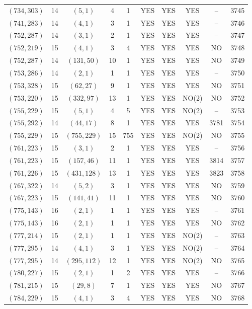 \begin{longtable}{|c|c|c|c|c|c|c|c|c|c|}
$(734, 303)$ & 14 & $(5, 1)$ & 4 & 1 & YES & YES & YES & -- & 3745\\
$(741, 283)$ & 14 & $(4, 1)$ & 3 & 1 & YES & YES & YES & -- & 3746\\
$(752, 287)$ & 14 & $(3, 1)$ & 2 & 1 & YES & YES & YES & -- & 3747\\
$(752, 219)$ & 15 & $(4, 1)$ & 3 & 4 & YES & YES & YES & NO & 3748\\
$(752, 287)$ & 14 & $(131, 50)$ & 10 & 1 & YES & YES & YES & NO & 3749\\
$(753, 286)$ & 14 & $(2, 1)$ & 1 & 1 & YES & YES & YES & -- & 3750\\
$(753, 328)$ & 15 & $(62, 27)$ & 9 & 1 & YES & YES & YES & NO & 3751\\
$(753, 220)$ & 15 & $(332, 97)$ & 13 & 1 & YES & YES & NO(2) & NO & 3752\\
$(755, 229)$ & 15 & $(5, 1)$ & 4 & 5 & YES & YES & NO(2) & -- & 3753\\
$(755, 292)$ & 14 & $(44, 17)$ & 8 & 1 & YES & YES & YES & 3781 & 3754\\
$(755, 229)$ & 15 & $(755, 229)$ & 15 & 755 & YES & YES & NO(2) & NO & 3755\\
$(761, 223)$ & 15 & $(3, 1)$ & 2 & 1 & YES & YES & YES & -- & 3756\\
$(761, 223)$ & 15 & $(157, 46)$ & 11 & 1 & YES & YES & YES & 3814 & 3757\\
$(761, 226)$ & 15 & $(431, 128)$ & 13 & 1 & YES & YES & YES & 3823 & 3758\\
$(767, 322)$ & 14 & $(5, 2)$ & 3 & 1 & YES & YES & YES & NO & 3759\\
$(767, 223)$ & 15 & $(141, 41)$ & 11 & 1 & YES & YES & YES & NO & 3760\\
$(775, 143)$ & 16 & $(2, 1)$ & 1 & 1 & YES & YES & YES & -- & 3761\\
$(775, 143)$ & 16 & $(2, 1)$ & 1 & 1 & YES & YES & YES & NO & 3762\\
$(777, 214)$ & 15 & $(2, 1)$ & 1 & 1 & YES & YES & NO(2) & -- & 3763\\
$(777, 295)$ & 14 & $(4, 1)$ & 3 & 1 & YES & YES & NO(2) & -- & 3764\\
$(777, 295)$ & 14 & $(295, 112)$ & 12 & 1 & YES & YES & NO(2) & NO & 3765\\
$(780, 227)$ & 15 & $(2, 1)$ & 1 & 2 & YES & YES & YES & -- & 3766\\
$(781, 215)$ & 15 & $(29, 8)$ & 7 & 1 & YES & YES & YES & NO & 3767\\
$(784, 229)$ & 15 & $(4, 1)$ & 3 & 4 & YES & YES & YES & NO & 3768\\

\end{longtable}
